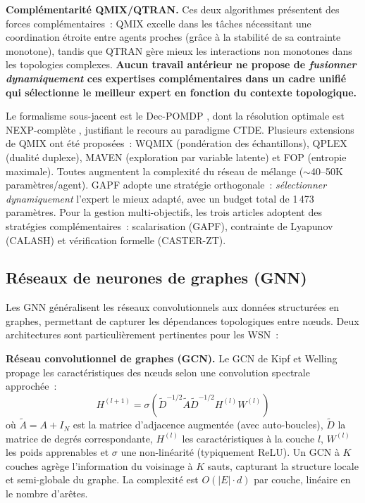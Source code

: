 \textbf{Complémentarité QMIX/QTRAN.} Ces deux algorithmes présentent des forces complémentaires~: QMIX excelle dans les tâches nécessitant une coordination étroite entre agents proches (grâce à la stabilité de sa contrainte monotone), tandis que QTRAN gère mieux les interactions non monotones dans les topologies complexes. \textbf{Aucun travail antérieur ne propose de \emph{fusionner dynamiquement} ces expertises complémentaires dans un cadre unifié qui sélectionne le meilleur expert en fonction du contexte topologique.}

Le formalisme sous-jacent est le Dec-POMDP \cite{OliehoekAmato2016}, dont la résolution optimale est NEXP-complète \cite{Bernstein2002DecPOMDP}, justifiant le recours au paradigme CTDE. Plusieurs extensions de QMIX ont été proposées~: WQMIX \cite{Rashid2020WQMIX} (pondération des échantillons), QPLEX \cite{Wang2021QPLEX} (dualité duplexe), MAVEN \cite{Mahajan2019MAVEN} (exploration par variable latente) et FOP \cite{Zhang2021FOP} (entropie maximale). Toutes augmentent la complexité du réseau de mélange ($\sim$40--50K paramètres/agent). GAPF adopte une stratégie orthogonale~: \emph{sélectionner dynamiquement} l'expert le mieux adapté, avec un budget total de 1\,473 paramètres. Pour la gestion multi-objectifs, les trois articles adoptent des stratégies complémentaires~: scalarisation (GAPF), contrainte de Lyapunov (CALASH) et vérification formelle (CASTER-ZT).

\subsection{Réseaux de neurones de graphes (GNN)}

Les GNN généralisent les réseaux convolutionnels aux données structurées en graphes, permettant de capturer les dépendances topologiques entre n\oe{}uds. Deux architectures sont particulièrement pertinentes pour les WSN~:

\textbf{Réseau convolutionnel de graphes (GCN).} Le GCN de Kipf et Welling \cite{kipf2017semi} propage les caractéristiques des n\oe{}uds selon une convolution spectrale approchée~:
\begin{equation}
    H^{(l+1)} = \sigma\!\left(\tilde{D}^{-1/2} \tilde{A} \tilde{D}^{-1/2} H^{(l)} W^{(l)}\right)
\end{equation}
où $\tilde{A} = A + I_N$ est la matrice d'adjacence augmentée (avec auto-boucles), $\tilde{D}$ la matrice de degrés correspondante, $H^{(l)}$ les caractéristiques à la couche $l$, $W^{(l)}$ les poids apprenables et $\sigma$ une non-linéarité (typiquement ReLU). Un GCN à $K$ couches agrège l'information du voisinage à $K$ sauts, capturant la structure locale et semi-globale du graphe. La complexité est $O(|E| \cdot d)$ par couche, linéaire en le nombre d'arêtes.

